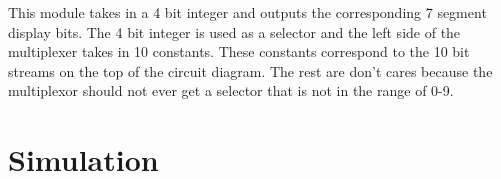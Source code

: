 \documentclass{article}
\begin{document}
This module takes in a 4 bit integer and outputs the corresponding 7 segment display bits. The 4 bit integer is used as a selector and the left side of the multiplexer takes in 10 constants. These constants correspond to the 10 bit streams on the top of the circuit diagram. The rest are don't cares because the multiplexor should not ever get a selector that is not in the range of 0-9.


\section*{Simulation}
\end{document}
